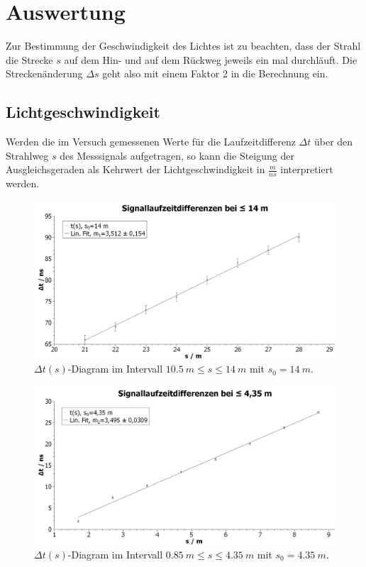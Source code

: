\chapter{Auswertung}
Zur Bestimmung der Geschwindigkeit des Lichtes ist zu beachten, dass der Strahl die Strecke \(s\) auf dem Hin- und auf
dem Rückweg jeweils ein mal durchläuft. Die Streckenänderung \(\Delta s\) geht also mit einem Faktor 2 in die Berechnung
ein.
%
%
\section{Lichtgeschwindigkeit}
Werden die im Versuch gemessenen Werte für die Laufzeitdifferenz \(\Delta t\) über den Strahlweg \(s\) des Messsignals aufgetragen,
so kann die Steigung der Ausgleichsgeraden als Kehrwert der Lichtgeschwindigkeit in \(\frac{m}{ns}\) interpretiert werden.
\begin{figure}[h]
    \centering
    \includegraphics[width=.9\textwidth]{scidavis/14m.jpeg}
    \caption[Signallaufzeitunterschiede mit \(s_0 = \SI{14}{m}\)]{\(\Delta t(s)\)-Diagram im Intervall \( \SI{10,5}{m} \leq s \leq \SI{14}{m}\) mit \(s_0=\SI{14}{m}\).}
    \label{fig:14m}
\end{figure}
%
\begin{figure}[h]
    \centering
    \includegraphics[width=.9\textwidth]{scidavis/4.35m.jpeg}
    \caption[Signallaufzeitunterschiede mit \(s_0 = \SI{4,35}{m}\)]{\(\Delta t(s)\)-Diagram im Intervall \( \SI{0,85}{m} \leq s \leq \SI{4,35}{m}\) mit \(s_0=\SI{4,35}{m}\).}
    \label{fig:4.35m}
\end{figure}
